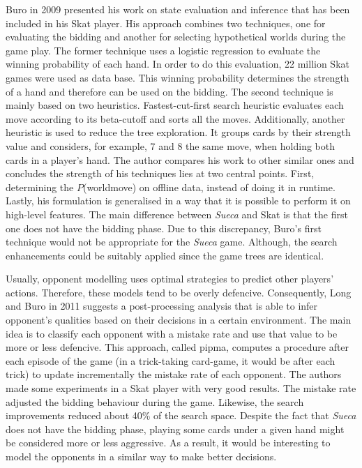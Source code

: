 Buro in 2009 \cite{Buro} presented his work on state evaluation and inference that has been included in his Skat player.
His approach combines two techniques, one for evaluating the bidding and another for selecting hypothetical worlds during the game play.
The former technique uses a logistic regression to evaluate the winning probability of each hand.
In order to do this evaluation, 22 million Skat games were used as data base.
This winning probability determines the strength of a hand and therefore can be used on the bidding.
The second technique is mainly based on two heuristics.
Fastest-cut-first search heuristic evaluates each move according to its beta-cutoff and sorts all the moves.
Additionally, another heuristic is used to reduce the tree exploration.
It groups cards by their strength value and considers, for example, 7 and 8 the same move, when holding both cards in a player's hand.
The author compares his work to other similar ones and concludes the strength of his techniques lies at two central points.
First, determining the $P$(world\textbar move) on offline data, instead of doing it in runtime.
Lastly, his formulation is generalised in a way that it is possible to perform it on high-level features.
The main difference between \emph{Sueca} and Skat is that the first one does not have the bidding phase.
Due to this discrepancy, Buro's first technique would not be appropriate for the \emph{Sueca} game.
Although, the search enhancements could be suitably applied since the game trees are identical.


Usually, opponent modelling uses optimal strategies to predict other players' actions.
Therefore, these models tend to be overly defencive.
Consequently, Long and Buro in 2011 \cite{Long2009} suggests a post-processing analysis that is able to infer opponent's qualities based on their decisions in a certain environment.
The main idea is to classify each opponent with a mistake rate and use that value to be more or less defencive.
This approach, called \gls{pipma}, computes a procedure after each episode of the game (in a trick-taking card-game, it would be after each trick) to update incrementally the mistake rate of each opponent.
The authors made some experiments in a Skat player with very good results.
The mistake rate adjusted the bidding behaviour during the game.
Likewise, the search improvements reduced about 40\% of the search space.
Despite the fact that \emph{Sueca} does not have the bidding phase, playing some cards under a given hand might be considered more or less aggressive.
As a result, it would be interesting to model the opponents in a similar way to make better decisions.

